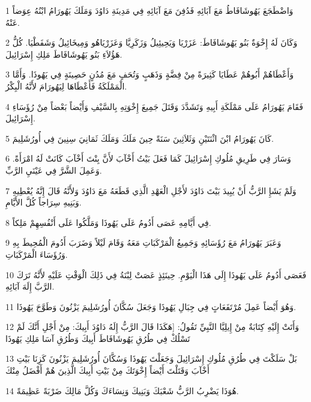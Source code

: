 \par 1 وَاضْطَجَعَ يَهُوشَافَاطُ مَعَ آبَائِهِ فَدُفِنَ مَعَ آبَائِهِ فِي مَدِينَةِ دَاوُدَ وَمَلَكَ يَهُورَامُ ابْنُهُ عِوَضاً عَنْهُ.
\par 2 وَكَانَ لَهُ إِخْوَةٌ بَنُو يَهُوشَافَاطَ: عَزَرْيَا وَيَحِيئِيلُ وَزَكَرِيَّا وَعَزَرْيَاهُو وَمِيخَائِيلُ وَشَفَطْيَا. كُلُّ هَؤُلاَءِ بَنُو يَهُوشَافَاطَ مَلِكِ إِسْرَائِيلَ.
\par 3 وَأَعْطَاهُمْ أَبُوهُمْ عَطَايَا كَثِيرَةً مِنْ فِضَّةٍ وَذَهَبٍ وَتُحَفٍ مَعَ مُدُنٍ حَصِينَةٍ فِي يَهُوذَا. وَأَمَّا الْمَمْلَكَةُ فَأَعْطَاهَا لِيَهُورَامَ لأَنَّهُ الْبِكْرُ.
\par 4 فَقَامَ يَهُورَامُ عَلَى مَمْلَكَةِ أَبِيهِ وَتَشَدَّدَ وَقَتَلَ جَمِيعَ إِخْوَتِهِ بِالسَّيْفِ وَأَيْضاً بَعْضاً مِنْ رُؤَسَاءِ إِسْرَائِيلَ.
\par 5 كَانَ يَهُورَامُ ابْنَ اثْنَتَيْنِ وَثَلاَثِينَ سَنَةً حِينَ مَلَكَ وَمَلَكَ ثَمَانِيَ سِنِينَ فِي أُورُشَلِيمَ.
\par 6 وَسَارَ فِي طَرِيقِ مُلُوكِ إِسْرَائِيلَ كَمَا فَعَلَ بَيْتُ أَخْآبَ لأَنَّ بِنْتَ أَخْآبَ كَانَتْ لَهُ امْرَأَةً. وَعَمِلَ الشَّرَّ فِي عَيْنَيِ الرَّبِّ.
\par 7 وَلَمْ يَشَإِ الرَّبُّ أَنْ يُبِيدَ بَيْتَ دَاوُدَ لأَجْلِ الْعَهْدِ الَّذِي قَطَعَهُ مَعَ دَاوُدَ وَلأَنَّهُ قَالَ إِنَّهُ يُعْطِيهِ وَبَنِيهِ سِرَاجاً كُلَّ الأَيَّامِ.
\par 8 فِي أَيَّامِهِ عَصَى أَدُومُ عَلَى يَهُوذَا وَمَلَّكُوا عَلَى أَنْفُسِهِمْ مَلِكاً.
\par 9 وَعَبَرَ يَهُورَامُ مَعَ رُؤَسَائِهِ وَجَمِيعُ الْمَرْكَبَاتِ مَعَهُ وَقَامَ لَيْلاً وَضَرَبَ أَدُومَ الْمُحِيطَ بِهِ وَرُؤَسَاءَ الْمَرْكَبَاتِ.
\par 10 فَعَصَى أَدُومُ عَلَى يَهُوذَا إِلَى هَذَا الْيَوْمِ. حِينَئِذٍ عَصَتْ لِبْنَةُ فِي ذَلِكَ الْوَقْتِ عَلَيْهِ لأَنَّهُ تَرَكَ الرَّبَّ إِلَهَ آبَائِهِ.
\par 11 وَهُوَ أَيْضاً عَمِلَ مُرْتَفَعَاتٍ فِي جِبَالِ يَهُوذَا وَجَعَلَ سُكَّانَ أُورُشَلِيمَ يَزْنُونَ وَطَوَّحَ يَهُوذَا.
\par 12 وَأَتَتْ إِلَيْهِ كِتَابَةٌ مِنْ إِيلِيَّا النَّبِيِّ تَقُولُ: [هَكَذَا قَالَ الرَّبُّ إِلَهُ دَاوُدَ أَبِيكَ: مِنْ أَجْلِ أَنَّكَ لَمْ تَسْلُكْ فِي طُرُقِ يَهُوشَافَاطَ أَبِيكَ وَطُرُقِ آسَا مَلِكِ يَهُوذَا
\par 13 بَلْ سَلَكْتَ فِي طُرُقِ مُلُوكِ إِسْرَائِيلَ وَجَعَلْتَ يَهُوذَا وَسُكَّانَ أُورُشَلِيمَ يَزْنُونَ كَزِنَا بَيْتِ أَخْآبَ وَقَتَلْتَ أَيْضاً إِخْوَتَكَ مِنْ بَيْتِ أَبِيكَ الَّذِينَ هُمْ أَفْضَلُ مِنْكَ
\par 14 هُوَذَا يَضْرِبُ الرَّبُّ شَعْبَكَ وَبَنِيكَ وَنِسَاءَكَ وَكُلَّ مَالِكَ ضَرْبَةً عَظِيمَةً.
